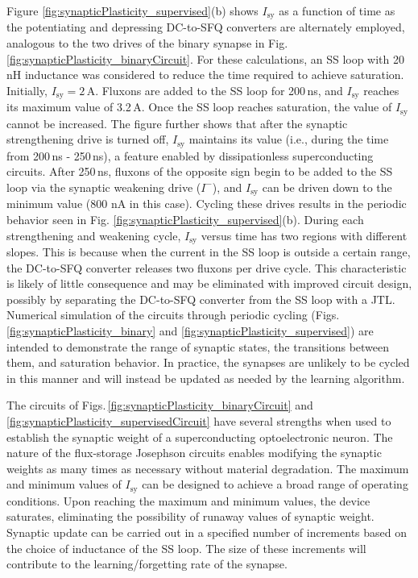 \documentclass[aip,amsmath,amssymb,reprint,nofootinbib]{revtex4-1}
\begin{document}
Figure \ref{fig:synapticPlasticity_supervised}(b) shows $I_{\mathrm{sy}}$ as a function of time as the potentiating and depressing DC-to-SFQ converters are alternately employed, analogous to the two drives of the binary synapse in Fig. \ref{fig:synapticPlasticity_binaryCircuit}. For these calculations, an SS loop with 20\,nH inductance was considered to reduce the time required to achieve saturation. Initially, $I_{\mathrm{sy}} = 2$\,\textmu A. Fluxons are added to the SS loop for 200\,ns, and $I_{\mathrm{sy}}$ reaches its maximum value of 3.2\,\textmu A. Once the SS loop reaches saturation, the value of $I_{\mathrm{sy}}$ cannot be increased. The figure further shows that after the synaptic strengthening drive is turned off, $I_{\mathrm{sy}}$ maintains its value (i.e., during the time from 200\,ns - 250\,ns), a feature enabled by dissipationless superconducting circuits. After 250\,ns, fluxons of the opposite sign begin to be added to the SS loop via the synaptic weakening drive ($I^-$), and $I_{\mathrm{sy}}$ can be driven down to the minimum value (800 nA in this case). Cycling these drives results in the periodic behavior seen in Fig. \ref{fig:synapticPlasticity_supervised}(b). During each strengthening and weakening cycle, $I_{\mathrm{sy}}$ versus time has two regions with different slopes. This is because when the current in the SS loop is outside a certain range, the DC-to-SFQ converter releases two fluxons per drive cycle. This characteristic is likely of little consequence and may be eliminated with improved circuit design, possibly by separating the DC-to-SFQ converter from the SS loop with a JTL. Numerical simulation of the circuits through periodic cycling (Figs.\,\ref{fig:synapticPlasticity_binary} and \ref{fig:synapticPlasticity_supervised}) are intended to demonstrate the range of synaptic states, the transitions between them, and saturation behavior. In practice, the synapses are unlikely to be cycled in this manner and will instead be updated as needed by the learning algorithm.

The circuits of Figs.\,\ref{fig:synapticPlasticity_binaryCircuit} and \ref{fig:synapticPlasticity_supervisedCircuit} have several strengths when used to establish the synaptic weight of a superconducting optoelectronic neuron. The nature of the flux-storage Josephson circuits enables modifying the synaptic weights as many times as necessary without material degradation. The maximum and minimum values of $I_{\mathrm{sy}}$ can be designed to achieve a broad range of operating conditions. Upon reaching the maximum and minimum values, the device saturates, eliminating the possibility of runaway values of synaptic weight. Synaptic update can be carried out in a specified number of increments based on the choice of inductance of the SS loop. The size of these increments will contribute to the learning/forgetting rate of the synapse. 
\end{document}

